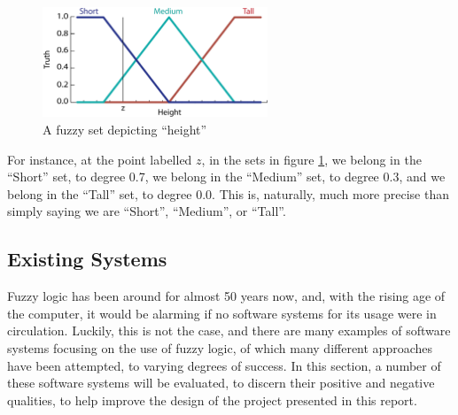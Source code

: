 \begin{figure}[ht!]
\begin{center}
\includegraphics[width=0.6\textwidth]{images/fuzExample.png}
\end{center}
\vspace{-5mm}
\caption{A fuzzy set depicting ``height''}
\label{fig:fuzExample}
\end{figure}
\noindent
For instance, at the point labelled $z$, in the sets in figure \ref{fig:fuzExample}, we belong in the ``Short'' set, to degree 0.7, we belong in the ``Medium'' set, to degree 0.3, and we belong in the ``Tall'' set, to degree 0.0. This is, naturally, much more precise than simply saying we are ``Short'', ``Medium'', or ``Tall''.

\subsection{Existing Systems}
\label{sec:existing-systems}

Fuzzy logic has been around for almost 50 years now, and, with the rising age of the computer, it would be alarming if no software systems for its usage were in circulation. Luckily, this is not the case, and there are many examples of software systems focusing on the use of fuzzy logic, of which many different approaches have been attempted, to varying degrees of success. In this section, a number of these software systems will be evaluated, to discern their positive and negative qualities, to help improve the design of the project presented in this report. 

